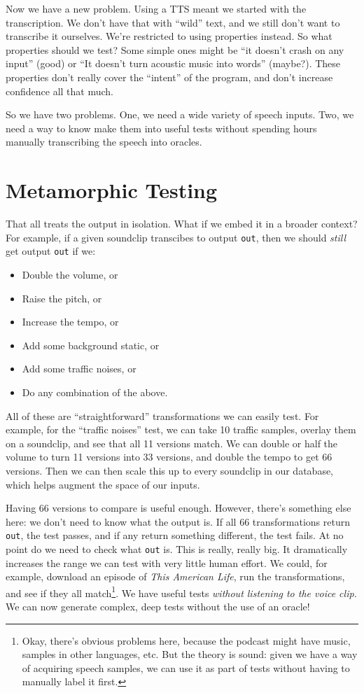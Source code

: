 Now we have a new problem. Using a TTS meant we started with the
transcription. We don't have that with ``wild'' text, and we still don't
want to transcribe it ourselves. We're restricted to using properties
instead. So what properties should we test? Some simple ones might be
``it doesn't crash on any input'' (good) or ``It doesn't turn acoustic
music into words'' (maybe?). These properties don't really cover the
``intent'' of the program, and don't increase confidence all that much.

So we have two problems. One, we need a wide variety of speech inputs.
Two, we need a way to know make them into useful tests without spending
hours manually transcribing the speech into oracles.

\section{Metamorphic Testing}
\label{metamorphic-testing}

That all treats the output in isolation. What if we embed it in a
broader context? For example, if a given soundclip transcibes to output
\texttt{out}, then we should \emph{still} get output \texttt{out} if we:

\begin{itemize}
\item
  Double the volume, or
\item
  Raise the pitch, or
\item
  Increase the tempo, or
\item
  Add some background static, or
\item
  Add some traffic noises, or
\item
  Do any combination of the above.
\end{itemize}
All of these are ``straightforward'' transformations we can easily test.
For example, for the ``traffic noises'' test, we can take 10 traffic
samples, overlay them on a soundclip, and see that all 11 versions
match. We can double or half the volume to turn 11 versions into 33
versions, and double the tempo to get 66 versions. Then we can then
scale this up to every soundclip in our database, which helps augment
the space of our inputs.

Having 66 versions to compare is useful enough. However, there's
something else here: we don't need to know what the output is. If all 66
transformations return \texttt{out}, the test passes, and if any return
something different, the test fails. At no point do we need to check
what \texttt{out} is. This is really, really big. It dramatically
increases the range we can test with very little human effort. We could,
for example, download an episode of \emph{This American Life}, run the
transformations, and see if they all
match\footnote{Okay, there's obvious problems here,
  because the podcast might have music, samples in other languages, etc.
  But the theory is sound: given we have a way of acquiring speech
  samples, we can use it as part of tests without having to manually
  label it first.}.
We have useful tests \emph{without listening to the voice clip.} We can
now generate complex, deep tests without the use of an oracle!

